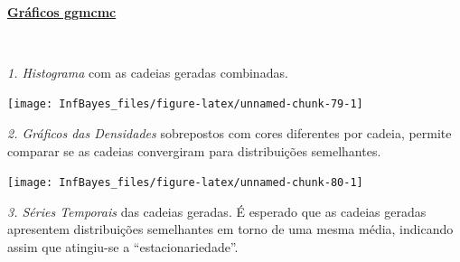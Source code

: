 \documentclass[
]{book}
\newenvironment{Shaded}{\begin{snugshade}}{\end{snugshade}}
\newcommand{\CommentTok}[1]{\textcolor[rgb]{0.56,0.35,0.01}{\textit{#1}}}
\newcommand{\KeywordTok}[1]{\textcolor[rgb]{0.13,0.29,0.53}{\textbf{#1}}}
\newcommand{\NormalTok}[1]{#1}
\newcommand{\OperatorTok}[1]{\textcolor[rgb]{0.81,0.36,0.00}{\textbf{#1}}}
\newcommand{\StringTok}[1]{\textcolor[rgb]{0.31,0.60,0.02}{#1}}
\begin{document}
\begin{Shaded}
\end{Shaded}

\(~\)

\href{ggmcmc.html}{\textbf{Gráficos ggmcmc}}

\(~\)

\emph{1. Histograma} com as cadeias geradas combinadas.

\begin{Shaded}
\end{Shaded}

\begin{center}\texttt{[image: InfBayes\_files/figure-latex/unnamed-chunk-79-1]} \end{center}

\emph{2. Gráficos das Densidades} sobrepostos com cores diferentes por cadeia, permite comparar se as cadeias convergiram para distribuições semelhantes.

\begin{Shaded}
\end{Shaded}

\begin{center}\texttt{[image: InfBayes\_files/figure-latex/unnamed-chunk-80-1]} \end{center}

\emph{3. Séries Temporais} das cadeias geradas. É esperado que as cadeias geradas apresentem distribuições semelhantes em torno de uma mesma média, indicando assim que atingiu-se a ``estacionariedade''.

\begin{Shaded}
\end{Shaded}
\end{document}
